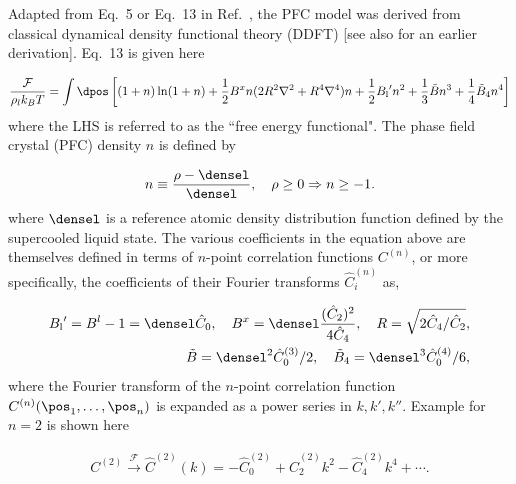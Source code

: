 
\label{appendix:pfc-rescaling}

Adapted from Eq.~5 or Eq.~13 in Ref.~\cite{huang2010phase}, the PFC model was derived from classical dynamical density functional theory (DDFT) [see also \cite{teeffelen2009derivation-3a7} for an earlier derivation].  Eq.~13 is given here

\begin{align}\label{eq-pfc-vacancy-free-energy-ddft}
\frac{\mathcal{F}}{\rho_l k_B T} = \int \dpos \left[ (1 + n)\ln(1 + n) + \frac{1}{2}B^x n (2 R^2 \nabla^2 + R^4 \nabla^4) n + \frac{1}{2}{B_\text{l}}' n^2 + \frac{1}{3} \tilde{B} n^3 + \frac{1}{4} \tilde{B}_4 n^4 \right]
\end{align}
%
where the LHS is referred to as the ``free energy functional".  The phase field crystal (PFC) density $n$ is defined by

\begin{align}\label{eq-pfc-density}
n \equiv \frac{\rho - \densel}{\densel}, \quad \rho \ge 0 \Rightarrow n \ge -1.
\end{align}
%
where $\densel$ is a reference atomic density distribution function defined by the supercooled liquid state.  The various coefficients in the equation above are themselves defined in terms of $n$-point correlation functions $C^{(n)}$, or more specifically, the coefficients of their Fourier transforms $\hat{C}^{(n)}_i$ as,

\begin{align}
{B_\text{l}}' = B^l - 1 = \densel \hat{C}_0, \quad B^x = \densel \frac{(\hat{C}_2)^2}{4 \hat{C}_4}, \quad R = \sqrt{2 \hat{C}_4/\hat{C}_2}, \\
\tilde{B} = \densel^2 \hat{C}^{(3)}_0/2, \quad \tilde{B}_4 = \densel^3 \hat{C}^{(4)}_0/6, 
\end{align}
%
where the Fourier transform of the $n$-point correlation function $C^{(n)}(\pos_1,\ldots,\pos_n)$ is expanded as a power series in $k, k', k''$.  Example for $n=2$ is shown here

\begin{align}
C^{(2)} \overset{\mathcal{F}}{\rightarrow} \hat{C}^{(2)}(k) = - \hat{C}^{(2)}_0 + \hat{C}^{(2)}_2 k^2 - \hat{C}^{(2)}_4 k^4 + \cdots.
\end{align}

